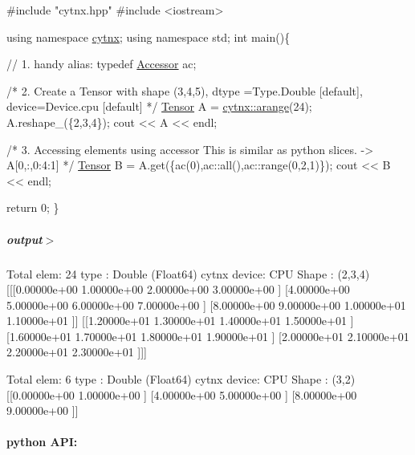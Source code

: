 \begin{DoxyCodeInclude}
\textcolor{preprocessor}{#include "cytnx.hpp"}
\textcolor{preprocessor}{#include <iostream>}


\textcolor{keyword}{using namespace }\hyperlink{namespacecytnx}{cytnx};
\textcolor{keyword}{using namespace }std;
\textcolor{keywordtype}{int} main()\{ 
    
    \textcolor{comment}{// 1. handy alias:}
    \textcolor{keyword}{typedef} \hyperlink{classcytnx_1_1Accessor}{Accessor} ac;
    

    \textcolor{comment}{/*}
\textcolor{comment}{        2. Create a Tensor with }
\textcolor{comment}{        shape (3,4,5),}
\textcolor{comment}{        dtype =Type.Double [default],}
\textcolor{comment}{        device=Device.cpu [default]}
\textcolor{comment}{    */}
    \hyperlink{classcytnx_1_1Tensor}{Tensor} A = \hyperlink{namespacecytnx_a733f9931141463bc8b7c61931ccf52c3}{cytnx::arange}(24);
    A.reshape\_(\{2,3,4\});
    cout << A << endl;


    \textcolor{comment}{/*}
\textcolor{comment}{        3. Accessing elements using accessor}
\textcolor{comment}{        This is similar as python slices. }
\textcolor{comment}{        -> A[0,:,0:4:1]}
\textcolor{comment}{    */}
    \hyperlink{classcytnx_1_1Tensor}{Tensor} B = A.get(\{ac(0),ac::all(),ac::range(0,2,1)\});
    cout << B << endl;


    \textcolor{keywordflow}{return} 0;
\}

\end{DoxyCodeInclude}
 \subparagraph*{output$>$}


\begin{DoxyVerbInclude}

Total elem: 24
type  : Double (Float64)
cytnx device: CPU
Shape : (2,3,4)
[[[0.00000e+00 1.00000e+00 2.00000e+00 3.00000e+00 ]
  [4.00000e+00 5.00000e+00 6.00000e+00 7.00000e+00 ]
  [8.00000e+00 9.00000e+00 1.00000e+01 1.10000e+01 ]]
 [[1.20000e+01 1.30000e+01 1.40000e+01 1.50000e+01 ]
  [1.60000e+01 1.70000e+01 1.80000e+01 1.90000e+01 ]
  [2.00000e+01 2.10000e+01 2.20000e+01 2.30000e+01 ]]]



Total elem: 6
type  : Double (Float64)
cytnx device: CPU
Shape : (3,2)
[[0.00000e+00 1.00000e+00 ]
 [4.00000e+00 5.00000e+00 ]
 [8.00000e+00 9.00000e+00 ]]


\end{DoxyVerbInclude}
 \paragraph*{python A\+PI\+:}


